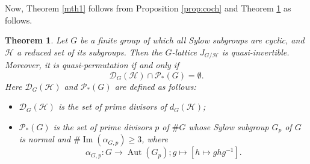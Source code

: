 \documentclass[12pt]{amsart}
\theoremstyle{plain}
\newtheorem{thm}{Theorem}[section]
\theoremstyle{definition}
\numberwithin{thm}{section}
\numberwithin{equation}{section}
\newcommand{\cH}{\mathcal{H}}
\DeclareMathOperator{\Ima}{Im}
\DeclareMathOperator{\Aut}{Aut}
\begin{document}
Now, Theorem \ref{mth1} follows from Proposition \ref{prop:coch} and Theorem \ref{thm:emmn} as follows. 

\begin{thm}\label{thm:emmn}
Let $G$ be a finite group of which all Sylow subgroups are cyclic, and $\cH$ a reduced set of its subgroups. Then the $G$-lattice $J_{G/\cH}$ is quasi-invertible. Moreover, it is quasi-permutation if and only if 
\begin{equation*}
\mathscr{D}_{G}(\cH)\cap \mathscr{P}_{*}(G)=\emptyset. 
\end{equation*}
Here $\mathscr{D}_{G}(\cH)$ and $\mathscr{P}_{*}(G)$ are defined as follows: 
\begin{itemize}
\item $\mathscr{D}_{G}(\cH)$ is the set of prime divisors of $d_{G}(\cH)$; 
\item $\mathscr{P}_{*}(G)$ is the set of prime divisors $p$ of $\#G$ whose Sylow subgroup $G_{p}$ of $G$ is normal and $\#\Ima(\alpha_{G,p})\geq 3$, where
\begin{equation*}
\alpha_{G,p}\colon G \rightarrow \Aut(G_{p});g \mapsto [h\mapsto ghg^{-1}]. 
\end{equation*}
\end{itemize}
\end{thm}
\end{document}
